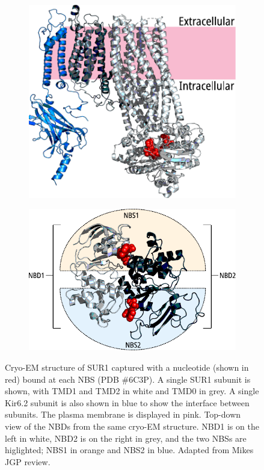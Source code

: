 \begin{figure}[h]
	\centering
	\begin{subfigure}[t]{0.4\textwidth}
		\caption{}\label{ch1fig:sur_struct}
		\centering
		\includegraphics[width=\textwidth]{sur_structure.pdf}
	\end{subfigure}
	\hfill
	\begin{subfigure}[t]{0.5\textwidth}
		\caption{}\label{ch1fig:nbd_struct}
		\centering
		\includegraphics[width=\textwidth]{nbd_structure.pdf}
	\end{subfigure}
	\caption[Structure of SUR1]{
		 Cryo-EM structure of SUR1 captured with a nucleotide (shown in red) bound at each NBS (PDB \#6C3P).
		A single SUR1 subunit is shown, with TMD1 and TMD2 in white and TMD0 in grey.
		A single Kir6.2 subunit is also shown in blue to show the interface between subunits.
		The plasma membrane is displayed in pink.
		 Top-down view of the NBDs from the same cryo-EM structure.
		NBD1 is on the left in white, NBD2 is on the right in grey, and the two NBSs are higlighted; NBS1 in orange and NBS2 in blue.
		Adapted from Mikes JGP review.
	}
\end{figure}

